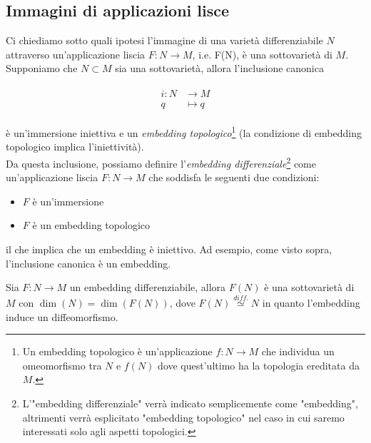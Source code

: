 \subsection{Immagini di applicazioni lisce}

Ci chiediamo sotto quali ipotesi l'immagine di una varietà differenziabile $ N $ attraverso un'applicazione liscia $ F : N \to M $, i.e. F(N), è una sottovarietà di $ M $.\\
Supponiamo che $ N \subset M $ sia una sottovarietà, allora l'inclusione canonica

\begin{align}
	\begin{split}
		i : N &\to M\\
		q &\mapsto q
	\end{split}
\end{align}

è un'immersione iniettiva e un \textit{embedding topologico}\footnote{%
	Un embedding topologico è un'applicazione $ f : N \to M $ che individua un omeomorfismo tra $ N $ e $ f(N) $ dove quest'ultimo ha la topologia ereditata da $ M $.%
} (la condizione di embedding topologico implica l'iniettività).\\
Da questa inclusione, possiamo definire l'\textit{embedding differenziale}\footnote{%
	L'"embedding differenziale" verrà indicato semplicemente come "embedding", altrimenti verrà esplicitato "embedding topologico" nel caso in cui saremo interessati solo agli aspetti topologici.%
} come un'applicazione liscia $ F : N \to M $ che soddisfa le seguenti due condizioni:

\begin{itemize}
	\item $ F $ è un'immersione
	
	\item $ F $ è un embedding topologico
\end{itemize}

il che implica che un embedding è iniettivo. Ad esempio, come visto sopra, l'inclusione canonica è un embedding.

\begin{theorem}\label{emb-subv}
	Sia $ F : N \to M $ un embedding differenziabile, allora $ F(N) $ è una sottovarietà di $ M $ con $ \dim(N) = \dim(F(N)) $, dove $ F(N) \stackrel{diff.}{\simeq} N $ in quanto l'embedding induce un diffeomorfismo.
\end{theorem}

